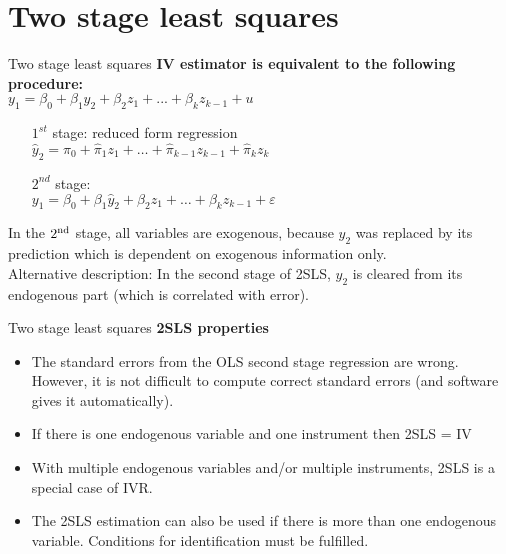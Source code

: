 \documentclass[usenames,dvipsnames]{beamer}
\begin{document}
\section{Two stage least squares}
\begin{frame}{Two stage least squares}
\textbf{IV estimator is equivalent to the following procedure: }\\
\medskip
$y_1=\beta_0+\beta_1 y_2+\beta_2 z_1+ ... + \beta_k z_{k-1}+u$
\medskip
\begin{itemize}
\item [$1^{st}$] stage: reduced form regression \\
\quad $\hat{y}_2=\hat{\pi}_0+\hat{\pi}_1 z_1 + \dots + \hat{\pi}_{k-1} z_{k-1} + \hat{\pi}_k z_k$
\item [$2^{nd}$] stage: \\
\quad $y_1=\beta_0+\beta_1 \hat{y}_2 + \beta_2 z_1 + \dots + \beta_k z_{k-1} + \varepsilon$
\medskip
\end{itemize}
In the $2^{\textnormal{nd}}$ stage, all variables are exogenous, because $y_2$ was replaced by its prediction which is dependent on exogenous information only. \\Alternative description: In the second stage of 2SLS, $y_2$ is cleared from its endogenous part (which is correlated with error). 
\end{frame}
\begin{frame}{Two stage least squares}
\textbf{2SLS properties}
\vspace{0.3cm}
\begin{itemize}
\item The standard errors from the OLS second stage regression are wrong. However, it is not difficult to compute correct standard errors (and software gives it automatically).
\vspace{0.3cm}
\item If there is one endogenous variable and one instrument then 2SLS = IV
\vspace{0.3cm}
\item With multiple endogenous variables and/or multiple instruments, 2SLS is a special case of IVR.
\vspace{0.3cm}
\item The 2SLS estimation can also be used if there is more than one endogenous variable. Conditions for identification must be fulfilled.
\end{itemize}
\end{frame}
\end{document}
